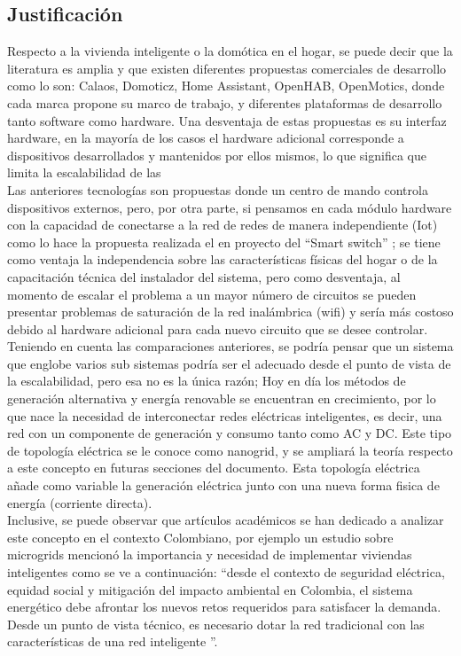 \subsection{Justificación}
Respecto a la vivienda inteligente o la domótica en el hogar, se puede decir que la literatura es amplia y que existen diferentes propuestas comerciales de desarrollo como lo son: Calaos, Domoticz, Home Assistant, OpenHAB, OpenMotics, donde cada marca propone su marco de trabajo, y diferentes plataformas de desarrollo tanto software como hardware. Una desventaja de estas propuestas es su interfaz hardware, en la mayoría de los casos el hardware adicional corresponde a dispositivos desarrollados y mantenidos por ellos mismos, lo que significa que limita la escalabilidad de las
\vspace{0.5cm}\\
Las anteriores tecnologías son propuestas donde un centro de mando controla dispositivos externos, pero, por otra parte, si pensamos en cada módulo hardware con la capacidad de conectarse a la red de redes de manera independiente (Iot) como lo hace la propuesta realizada el en proyecto del “Smart switch” \cite{GiralSala2016}; se tiene como ventaja la independencia sobre las características físicas del hogar o de la capacitación técnica del instalador del sistema, pero como desventaja, al momento de escalar el problema a un mayor número de circuitos se pueden presentar problemas de saturación de la red inalámbrica (wifi) y sería más costoso debido al hardware adicional para cada nuevo circuito que se desee controlar.
\vspace{0.5cm}\\
Teniendo en cuenta las comparaciones anteriores, se podría pensar que un sistema que englobe varios sub sistemas podría ser el adecuado desde el punto de vista de la escalabilidad, pero esa no es la única razón; Hoy en día los métodos de generación alternativa y energía renovable se encuentran en crecimiento, por lo que nace la necesidad de interconectar redes eléctricas inteligentes, es decir, una red con un componente de generación y consumo tanto como AC y DC. Este tipo de topología eléctrica se le conoce como nanogrid, y se ampliará la teoría respecto a este concepto en futuras secciones del documento. Esta topología eléctrica añade como variable la generación eléctrica junto con una nueva forma fisica de energía (corriente directa).
\vspace{0.5cm}\\
Inclusive, se puede observar que artículos académicos se han dedicado a analizar este concepto en el contexto Colombiano,  por ejemplo un estudio sobre microgrids mencionó la importancia y necesidad de implementar viviendas inteligentes como se ve a continuación: “desde el contexto de seguridad eléctrica, equidad social y mitigación del impacto ambiental en Colombia, el sistema energético debe afrontar los nuevos retos requeridos para satisfacer la demanda. Desde un punto de vista técnico, es necesario dotar la red tradicional con las características de una red inteligente ”. 
